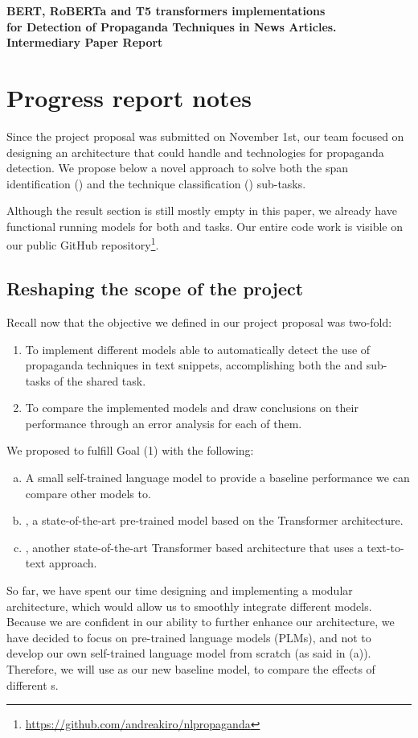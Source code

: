 \begin{strip}
    \centering
    \textbf{\Large BERT, RoBERTa and T5 transformers implementations \\ 
    for Detection of Propaganda Techniques in News Articles.}\\
    \vspace{0.2cm}
    \textbf{\large Intermediary Paper Report} \normalsize
    \vspace{4mm}
\end{strip}

\section*{Progress report notes}
Since the project proposal was submitted on November 1st, our team focused on designing an architecture that could handle  and  technologies for propaganda detection. We propose below a novel approach to solve both the span identification () and the technique classification () sub-tasks.

Although the result section is still mostly empty in this paper, we already have functional running models for both  and  tasks.
Our entire code work is visible on our public GitHub repository\footnote{ \url{https://github.com/andreakiro/nlpropaganda}}.

\subsection*{Reshaping the scope of the project}
Recall now that the objective we defined in our project proposal was two-fold:
\begin{enumerate}
    \item To implement different models able to automatically detect the use of propaganda techniques in text snippets, accomplishing both the  and  sub-tasks of the shared task.
    \item To compare the implemented models and draw conclusions on their performance through an error analysis for each of them.
\end{enumerate}
We proposed to fulfill Goal (1) with the following:
\begin{enumerate}[(a)]
    \item A small self-trained language model to provide a baseline performance we can compare other models to.
    \item {} \cite{roberta}, a state-of-the-art pre-trained model based on the Transformer architecture.
    \item {} \cite{2020t5}, another state-of-the-art Transformer based architecture that uses a text-to-text approach.
\end{enumerate}
So far, we have spent our time designing and implementing a modular architecture, which would allow us to smoothly integrate different models.
Because we are confident in our ability to further enhance our architecture, we have decided to focus on pre-trained language models (PLMs), and not to develop our own self-trained language model from scratch (as said in (a)). Therefore, we will use  as our new baseline model, to compare the effects of different s.

